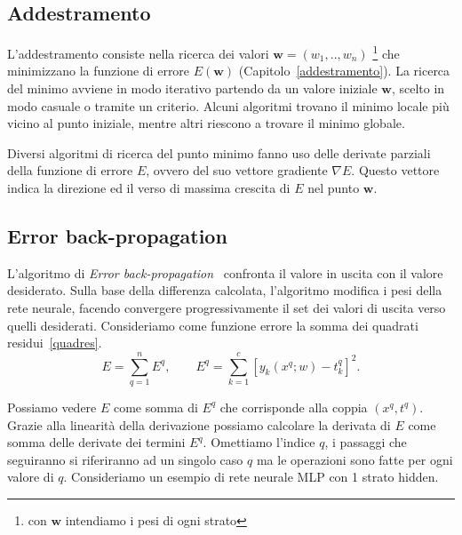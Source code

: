 \documentclass[11pt,a4paper,twoside,
openright]{book}
\begin{document}
\subsection{Addestramento}
L'addestramento consiste nella ricerca dei valori $\textbf{w}=(w_1,..,w_n)$ \footnote{con $\textbf{w}$ intendiamo i pesi di ogni strato} che minimizzano la funzione di errore $E(\textbf{w})$ (Capitolo~\ref{addestramento}).
La ricerca del minimo avviene in modo iterativo partendo da un valore iniziale $\textbf{w}$, scelto in modo casuale o tramite un criterio. Alcuni algoritmi trovano il minimo locale più vicino al punto iniziale, mentre altri riescono a trovare il minimo globale.

Diversi algoritmi di ricerca del punto minimo fanno uso delle derivate parziali della funzione di errore $E$, ovvero del suo vettore gradiente $\nabla E$. Questo vettore indica la direzione ed il verso di massima crescita di $E$ nel punto $\textbf{w}$.
\subsection*{Error back-propagation}
L'algoritmo di \textit{Error back-propagation}~\cite{Rumelhart20081B} confronta il valore in uscita con il valore desiderato. Sulla base della differenza calcolata, l'algoritmo modifica i pesi della rete neurale, facendo convergere progressivamente il set dei valori di uscita verso quelli desiderati.
Consideriamo come funzione errore la somma dei quadrati residui~\eqref{quadres}. 
\begin{equation}
E = \sum\limits_{q=1}^n E^{q}, \qquad
E^q = \sum\limits_{k=1}^c [y_k (x^q;w) - t_{k}^{q}]^2.
\label{resq}
\end{equation}

Possiamo vedere $E$ come somma di $E^q$ che corrisponde alla coppia $(x^q,t^q)$. Grazie alla linearità della derivazione possiamo calcolare la derivata di $E$ come somma delle derivate dei termini $E^q$. Omettiamo l'indice $q$, i passaggi che seguiranno si riferiranno ad un singolo caso $q$ ma le operazioni sono fatte per ogni valore di $q$. Consideriamo un esempio di rete neurale MLP con 1 strato hidden.
\end{document}
